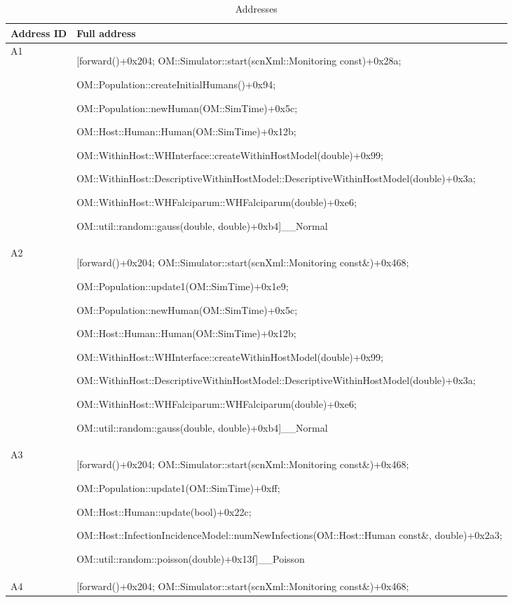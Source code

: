 \documentclass{article}
\begin{document}
{  \begin{table}[b!]
  \footnotesize
  \setlength{\tabcolsep}{1mm}
  \caption{Addresses }
  \label{table:addresses}
  \def\arraystretch{1.25}
  \begin{tabularx}{\textwidth}{@{}lX@{}} 
    \toprule
    Address ID & Full address \\
    \midrule
  A1 & [forward()+0x204; OM::Simulator::start(scnXml::Monitoring const)+0x28a;

  OM::Population::createInitialHumans()+0x94; 

  OM::Population::newHuman(OM::SimTime)+0x5c;

  OM::Host::Human::Human(OM::SimTime)+0x12b;

  OM::WithinHost::WHInterface::createWithinHostModel(double)+0x99;

  OM::WithinHost::DescriptiveWithinHostModel::DescriptiveWithinHostModel(double)+0x3a;

  OM::WithinHost::WHFalciparum::WHFalciparum(double)+0xe6; 

  OM::util::random::gauss(double, double)+0xb4]\_\_Normal\\
  A2 & [forward()+0x204; 
  OM::Simulator::start(scnXml::Monitoring const\&)+0x468;

   OM::Population::update1(OM::SimTime)+0x1e9;

   OM::Population::newHuman(OM::SimTime)+0x5c;

   OM::Host::Human::Human(OM::SimTime)+0x12b;

   OM::WithinHost::WHInterface::createWithinHostModel(double)+0x99; 

   OM::WithinHost::DescriptiveWithinHostModel::DescriptiveWithinHostModel(double)+0x3a;

   OM::WithinHost::WHFalciparum::WHFalciparum(double)+0xe6;

   OM::util::random::gauss(double, double)+0xb4]\_\_Normal \\
  A3 & [forward()+0x204; OM::Simulator::start(scnXml::Monitoring const\&)+0x468;

   OM::Population::update1(OM::SimTime)+0xff;

   OM::Host::Human::update(bool)+0x22c;

   OM::Host::InfectionIncidenceModel::numNewInfections(OM::Host::Human const\&, double)+0x2a3;

   OM::util::random::poisson(double)+0x13f]\_\_Poisson\\
  A4 & [forward()+0x204; OM::Simulator::start(scnXml::Monitoring const\&)+0x468; 


\end{tabularx}
\end{table}}
\end{document}
